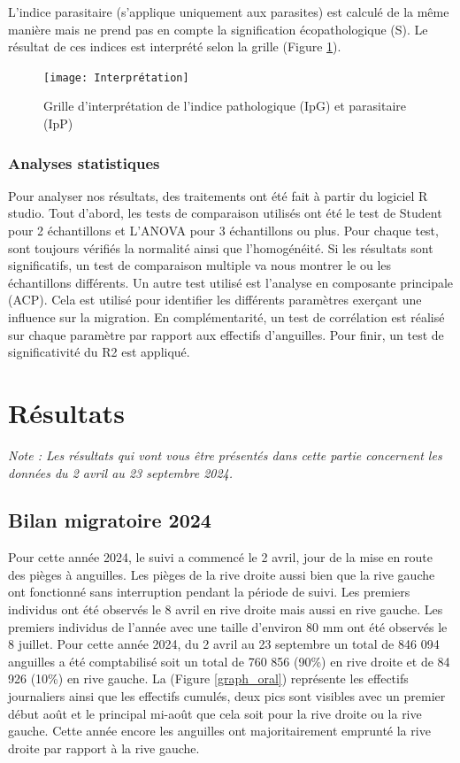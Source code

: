 \documentclass[11pt,titlepage,twoside]{article}\usepackage[]{graphicx}\usepackage[table]{xcolor}
\begin{document}
L’indice parasitaire (s’applique uniquement aux parasites) est calculé de la même manière mais ne prend pas en compte la signification écopathologique (S). Le résultat de ces indices est interprété selon la grille (Figure \ref{Interprétation}).

\begin{figure}[htpb]
\centering
\texttt{[image: Interprétation]}
\caption{Grille d'interprétation de l'indice pathologique (IpG) et parasitaire (IpP) \citep{elie_sante_2014}}
\label{Interprétation}
\end{figure}

\subsubsection{Analyses statistiques}
	
Pour analyser nos résultats, des traitements ont été fait à partir du logiciel R studio.
Tout d’abord, les tests de comparaison utilisés ont été le test de Student pour 2 échantillons et L’ANOVA pour 3 échantillons ou plus. Pour chaque test, sont toujours vérifiés la normalité ainsi que l’homogénéité. Si les résultats sont significatifs, un test de comparaison multiple va nous montrer le ou les échantillons différents.
Un autre test utilisé est l’analyse en composante principale (ACP). Cela est utilisé pour identifier les différents paramètres exerçant une influence sur la migration. En complémentarité, un test de corrélation est réalisé sur chaque paramètre par rapport aux effectifs d’anguilles. Pour finir, un test de significativité du R2 est appliqué.


\section{Résultats}

\textit{Note : Les résultats qui vont vous être présentés dans cette partie concernent les données du 2 avril au 23 septembre 2024.}

\subsection{Bilan migratoire 2024 }

Pour cette année 2024, le suivi a commencé le 2 avril, jour de la mise en route des pièges à anguilles. Les pièges de la rive droite aussi bien que la rive gauche ont fonctionné sans interruption pendant la période de suivi. Les premiers individus ont été observés le 8 avril en rive droite mais aussi en rive gauche. Les premiers individus de l’année avec une taille d’environ 80 mm ont été observés le 8 juillet. Pour cette année 2024, du 2 avril au 23 septembre un total de 846 094 anguilles a été comptabilisé soit un total de 760 856 (90\%) en rive droite et de 84 926 (10\%) en rive gauche. La (Figure \ref{graph_oral}) représente les effectifs journaliers ainsi que les effectifs cumulés, deux pics sont visibles avec un premier début août et le principal mi-août que cela soit pour la rive droite ou la rive gauche. Cette année encore les anguilles ont majoritairement emprunté la rive droite par rapport à la rive gauche.
\end{document}

